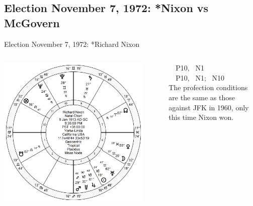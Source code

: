 \subsection{Election November 7, 1972: *Nixon vs McGovern}
\begin{frame}[t]{Election November 7, 1972: *Richard Nixon}
\small

\begin{columns}[T, onlytextwidth]
\vspace{-1em}
{\includegraphics[width=0.9\textwidth]{charts/Nixon.png}}
\fontsize{8pt}{9pt}\selectfont

\Sun\, \Trine\, P10, \Trine\, N1 \\
\Venus\, \Square\, P10, \Opposition\, N1; \Trine\, N10 \\

The profection conditions are the same as those against JFK in 1960, only this time Nixon won.


\end{columns}
\end{frame}
